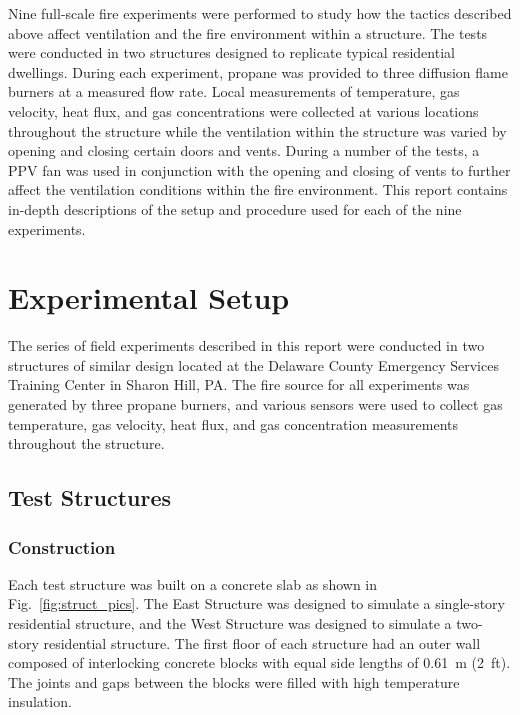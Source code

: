 \documentclass[12pt,oneside]{book}
\begin{document}
Nine full-scale fire experiments were performed to study how the tactics described above affect ventilation and the fire environment within a structure. The tests were conducted in two structures designed to replicate typical residential dwellings. During each experiment, propane was provided to three diffusion flame burners at a measured flow rate. Local measurements of temperature, gas velocity, heat flux, and gas concentrations were collected at various locations throughout the structure while the ventilation within the structure was varied by opening and closing certain doors and vents. During a number of the tests, a PPV fan was used in conjunction with the opening and closing of vents to further affect the ventilation conditions within the fire environment. This report contains in-depth descriptions of the setup and procedure used for each of the nine experiments.


\chapter{Experimental Setup}
\label{chap:Experimental_Setup}
The series of field experiments described in this report were conducted in two structures of similar design located at the Delaware County Emergency Services Training Center in Sharon Hill, PA. The fire source for all experiments was generated by three propane burners, and various sensors were used to collect gas temperature, gas velocity, heat flux, and gas concentration measurements throughout the structure.

\section{Test Structures}
\label{sec:Test_Structures}

\subsection{Construction}
\label{sec:construction}
Each test structure was built on a concrete slab as shown in Fig.~\ref{fig:struct_pics}. The East Structure was designed to simulate a single-story residential structure, and the West Structure was designed to simulate a two-story residential structure. The first floor of each structure had an outer wall composed of interlocking concrete blocks with equal side lengths of 0.61~m (2~ft). The joints and gaps between the blocks were filled with high temperature insulation.
\end{document}
